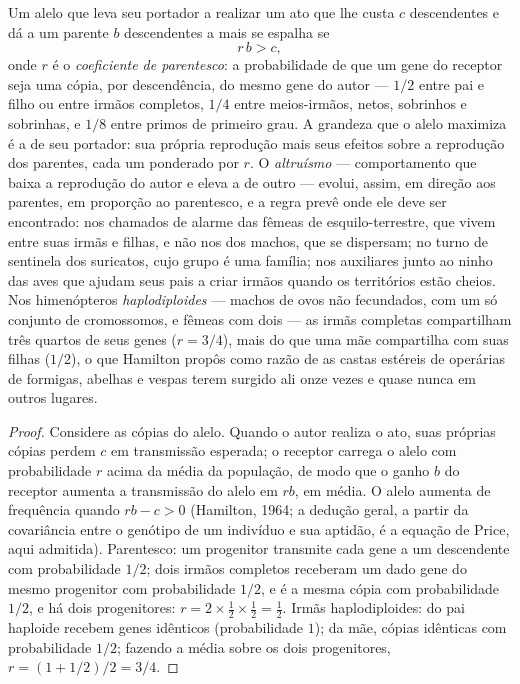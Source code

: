 \begin{theorem}\label{thm:b3:behavioural-ecology:hamilton}
Um alelo que leva seu portador a realizar um ato que lhe custa $c$
descendentes e dá a um parente $b$ descendentes a mais se espalha se
\[
r\,b > c ,
\]
onde $r$ é o \emph{coeficiente de parentesco}: a probabilidade de que um
gene do receptor seja uma cópia, por descendência, do mesmo gene do
autor --- $1/2$ entre pai e filho ou entre irmãos completos, $1/4$ entre
meios-irmãos, netos, sobrinhos e sobrinhas, e $1/8$ entre primos de
primeiro grau. A grandeza que o alelo maximiza é a \emph{} de seu portador: sua própria reprodução mais seus efeitos
sobre a reprodução dos parentes, cada um ponderado por $r$. O
\emph{altruísmo} --- comportamento que baixa a reprodução do autor e
eleva a de outro --- evolui, assim, em direção aos parentes, em proporção
ao parentesco, e a regra prevê onde ele deve ser encontrado: nos chamados
de alarme das fêmeas de esquilo-terrestre, que vivem entre suas irmãs e
filhas, e não nos dos machos, que se dispersam; no turno de sentinela dos
suricatos, cujo grupo é uma família; nos auxiliares junto ao ninho das
aves que ajudam seus pais a criar irmãos quando os territórios estão
cheios. Nos himenópteros \emph{haplodiploides} --- machos de ovos não
fecundados, com um só conjunto de cromossomos, e fêmeas com dois --- as
irmãs completas compartilham três quartos de seus genes ($r = 3/4$), mais
do que uma mãe compartilha com suas filhas ($1/2$), o que Hamilton propôs
como razão de as castas estéreis de operárias de formigas, abelhas e
vespas terem surgido ali onze vezes e quase nunca em outros lugares.
\end{theorem}
\begin{proof}
Considere as cópias do alelo. Quando o autor realiza o ato, suas próprias
cópias perdem $c$ em transmissão esperada; o receptor carrega o alelo com
probabilidade $r$ acima da média da população, de modo que o ganho $b$ do
receptor aumenta a transmissão do alelo em $rb$, em média. O alelo
aumenta de frequência quando $rb - c > 0$ (Hamilton, 1964; a dedução
geral, a partir da covariância entre o genótipo de um indivíduo e sua
aptidão, é a equação de Price, aqui admitida). Parentesco: um progenitor
transmite cada gene a um descendente com probabilidade $1/2$; dois irmãos
completos receberam um dado gene do mesmo progenitor com probabilidade
$1/2$, e é a mesma cópia com probabilidade $1/2$, e há dois progenitores:
$r = 2\times\tfrac{1}{2}
\times\tfrac{1}{2} = \tfrac{1}{2}$. Irmãs
haplodiploides: do pai haploide recebem genes idênticos (probabilidade
$1$); da mãe, cópias idênticas com probabilidade $1/2$; fazendo a média
sobre os dois progenitores, $r = (1 + 1/2)/2 = 3/4$.
\end{proof}

